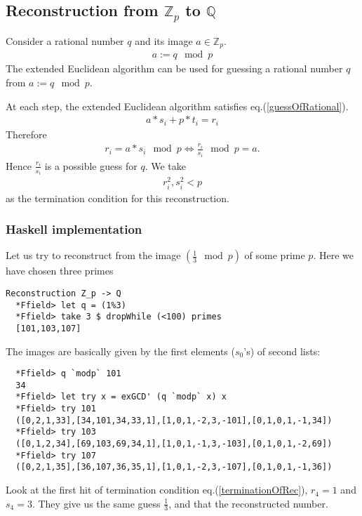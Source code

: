 \documentclass[11pt]{book}
\begin{document}
\subsection{Reconstruction from $\mathbb{Z}_p$ to $\mathbb{Q}$}
Consider a rational number $q$ and its image $a \in \mathbb{Z}_p$.
\begin{eqnarray}
a := q \mod p
\end{eqnarray}
The extended Euclidean algorithm can be used for guessing a rational number $q$ from $a := q \mod p$.

At each step, the extended Euclidean algorithm satisfies eq.(\ref{guessOfRational}).
\begin{eqnarray}
a*s_i + p*t_i = r_i
\end{eqnarray}
Therefore
\begin{eqnarray}
r_i = a*s_i \mod p \Leftrightarrow \frac{r_i}{s_i} \mod p = a.
\end{eqnarray}
Hence $\frac{r_i}{s_i}$ is a possible guess for $q$.
We take
\begin{eqnarray}
\label{terminationOfRec}
r_i^2 , s_i^2 < p
\end{eqnarray}
as the termination condition for this reconstruction.

\subsubsection{Haskell implementation}
Let us try to reconstruct from the image $(\frac{1}{3} \mod p)$ of some prime $p$.
Here we have chosen three primes
\begin{verbatim}
Reconstruction Z_p -> Q
  *Ffield> let q = (1%3)
  *Ffield> take 3 $ dropWhile (<100) primes
  [101,103,107]
\end{verbatim}
The images are basically given by the first elements ($s_0$'s) of second lists:
\begin{verbatim}  
  *Ffield> q `modp` 101
  34
  *Ffield> let try x = exGCD' (q `modp` x) x
  *Ffield> try 101
  ([0,2,1,33],[34,101,34,33,1],[1,0,1,-2,3,-101],[0,1,0,1,-1,34])
  *Ffield> try 103
  ([0,1,2,34],[69,103,69,34,1],[1,0,1,-1,3,-103],[0,1,0,1,-2,69])
  *Ffield> try 107
  ([0,2,1,35],[36,107,36,35,1],[1,0,1,-2,3,-107],[0,1,0,1,-1,36])  
\end{verbatim}
Look at the first hit of termination condition eq.(\ref{terminationOfRec}), $r_4=1$ and $s_4=3$.
They give us the same guess $\frac{1}{3}$, and that the reconstructed number.
\end{document}
